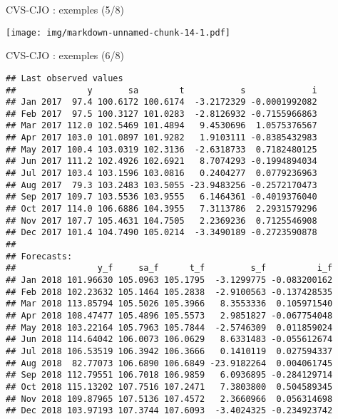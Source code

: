 \documentclass[10pt,xcolor=table,color={dvipsnames,usenames},ignorenonframetext,usepdftitle=false,french]{beamer}
\newenvironment{Shaded}{\begin{snugshade}}{\end{snugshade}}
\newcommand{\KeywordTok}[1]{\textcolor[rgb]{0.13,0.29,0.53}{\textbf{#1}}}
\newcommand{\NormalTok}[1]{#1}
\newcommand{\OperatorTok}[1]{\textcolor[rgb]{0.81,0.36,0.00}{\textbf{#1}}}
\begin{document}
\begin{frame}[fragile]{CVS-CJO : exemples (5/8)}
\protect\hypertarget{cvs-cjo-exemples-58}{}

\begin{Shaded}
\end{Shaded}

\texttt{[image: img/markdown-unnamed-chunk-14-1.pdf]}

\end{frame}

\begin{frame}[fragile]{CVS-CJO : exemples (6/8)}
\protect\hypertarget{cvs-cjo-exemples-68}{}

\footnotesize

\begin{Shaded}
\end{Shaded}

\begin{verbatim}
## Last observed values
##              y       sa        t           s             i
## Jan 2017  97.4 100.6172 100.6174  -3.2172329 -0.0001992082
## Feb 2017  97.5 100.3127 101.0283  -2.8126932 -0.7155966863
## Mar 2017 112.0 102.5469 101.4894   9.4530696  1.0575376567
## Apr 2017 103.0 101.0897 101.9282   1.9103111 -0.8385432983
## May 2017 100.4 103.0319 102.3136  -2.6318733  0.7182480125
## Jun 2017 111.2 102.4926 102.6921   8.7074293 -0.1994894034
## Jul 2017 103.4 103.1596 103.0816   0.2404277  0.0779236963
## Aug 2017  79.3 103.2483 103.5055 -23.9483256 -0.2572170473
## Sep 2017 109.7 103.5536 103.9555   6.1464361 -0.4019376040
## Oct 2017 114.0 106.6886 104.3955   7.3113786  2.2931579296
## Nov 2017 107.7 105.4631 104.7505   2.2369236  0.7125546908
## Dec 2017 101.4 104.7490 105.0214  -3.3490189 -0.2723590878
## 
## Forecasts:
##                y_f     sa_f      t_f         s_f          i_f
## Jan 2018 101.96630 105.0963 105.1795  -3.1299775 -0.083200162
## Feb 2018 102.23632 105.1464 105.2838  -2.9100563 -0.137428535
## Mar 2018 113.85794 105.5026 105.3966   8.3553336  0.105971540
## Apr 2018 108.47477 105.4896 105.5573   2.9851827 -0.067754048
## May 2018 103.22164 105.7963 105.7844  -2.5746309  0.011859024
## Jun 2018 114.64042 106.0073 106.0629   8.6331483 -0.055612674
## Jul 2018 106.53519 106.3942 106.3666   0.1410119  0.027594337
## Aug 2018  82.77073 106.6890 106.6849 -23.9182264  0.004061745
## Sep 2018 112.79551 106.7018 106.9859   6.0936895 -0.284129714
## Oct 2018 115.13202 107.7516 107.2471   7.3803800  0.504589345
## Nov 2018 109.87965 107.5136 107.4572   2.3660966  0.056314698
## Dec 2018 103.97193 107.3744 107.6093  -3.4024325 -0.234923742
\end{verbatim}

\end{frame}
\end{document}
